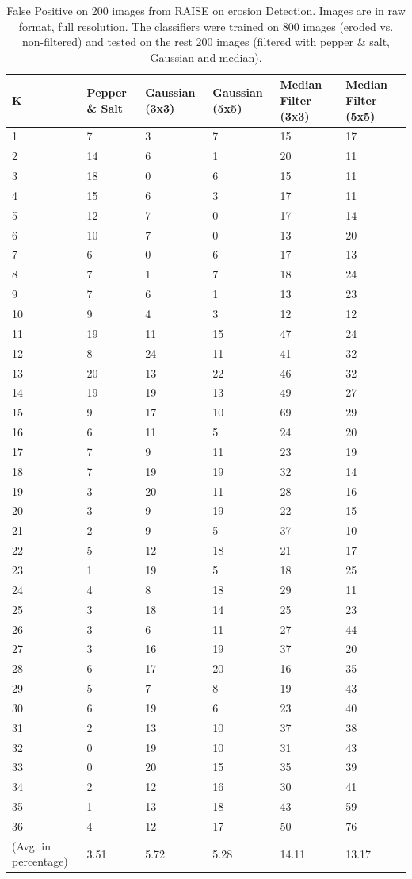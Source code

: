 \documentclass[review]{elsarticle}
\begin{document}
\begin{longtable}{C{2cm}|C{1.5cm}C{1.5cm}C{1.5cm}C{1.5cm}C{1.5cm}}
	\caption{False Positive on 200 images from RAISE on erosion Detection. Images are in raw format, full resolution. The classifiers were trained on 800 images (eroded vs. non-filtered) and tested on the rest 200 images (filtered with pepper \& salt, Gaussian and median).}
	\label{table:fp_filters}\\
	\hline\hline
	K&Pepper \& Salt&Gaussian (3x3)&Gaussian (5x5)&Median Filter (3x3)&Median Filter (5x5)\\
	&7&3&7&15&17\\
	2&14&6&1&20&11\\
	3&18&0&6&15&11\\
	4&15&6&3&17&11\\
	5&12&7&0&17&14\\
	6&10&7&0&13&20\\
	7&6&0&6&17&13\\
	8&7&1&7&18&24\\
	9&7&6&1&13&23\\
	10&9&4&3&12&12\\
	11&19&11&15&47&24\\
	12&8&24&11&41&32\\
	13&20&13&22&46&32\\
	14&19&19&13&49&27\\
	15&9&17&10&69&29\\
	16&6&11&5&24&20\\
	17&7&9&11&23&19\\
	18&7&19&19&32&14\\
	19&3&20&11&28&16\\
	20&3&9&19&22&15\\
	21&2&9&5&37&10\\
	22&5&12&18&21&17\\
	23&1&19&5&18&25\\
	24&4&8&18&29&11\\
	25&3&18&14&25&23\\
	26&3&6&11&27&44\\
	27&3&16&19&37&20\\
	28&6&17&20&16&35\\
	29&5&7&8&19&43\\
	30&6&19&6&23&40\\
	31&2&13&10&37&38\\
	32&0&19&10&31&43\\
	33&0&20&15&35&39\\
	34&2&12&16&30&41\\
	35&1&13&18&43&59\\
	36&4&12&17&50&76\\
	\hline
	(Avg. in percentage)&3.51&5.72&5.28&14.11&13.17\\
	
	\hline\hline	
\end{longtable}
\end{document}
